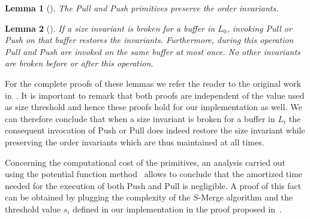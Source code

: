 \documentclass[review,number]{elsarticle}
\newtheorem{lemma}{Lemma}
\newcommand{\SMerge}{$S$-\textsf{Merge}}
\newcommand{\Push}{\textsf{Push}}
\newcommand{\Pull}{\textsf{Pull}}
\begin{document}
\begin{lemma}[{\cite[Lemma~1]{JMM07}}]\label{lem:1}
The \Pull{} and \Push{} primitives preserve the order invariants.
\end{lemma}

\begin{lemma}[{\cite[Lemma~3]{JMM07}}]\label{lem:2}
If a size invariant is broken for a buffer in $L_0$, invoking \Pull{} or \Push{}
on that buffer restores the invariants. Furthermore, during this operation
\Pull{} and \Push{} are invoked on the same buffer at most once. No other
invariants are broken before or after this operation.
\end{lemma}

For the complete proofs of these lemmas we refer the reader to the original work
in~\cite{JMM07}. It is important to remark that both proofs are independent of
the value used as size threshold and hence these proofs hold for our
implementation as well.
We can therefore conclude that when a size invariant is broken for a buffer in
$L_{i}$ the consequent invocation of \Push{} or \Pull{} does indeed restore the
size invariant while preserving the order invariants which are thus maintained
at all times.


Concerning the computational cost of the primitives, an analysis carried out
using the potential function method~\cite[Section 17.3]{Cormen09} allows to
conclude that the amortized time
needed for the execution of both \Push{} and \Pull{} is negligible. A proof of
this fact can be obtained by plugging the complexity of the \SMerge{} algorithm 
and the threshold value $s_i$ defined in our implementation in the proof
proposed in~\cite[Lemma 5]{JMM07}.
\end{document}
